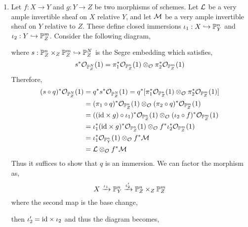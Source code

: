 \documentclass[12pt]{article}
\begin{document}
\begin{enumerate}
\item Let $f : X \to Y$ and $g : Y \to Z$ be two morphisms of schemes. Let $\L$ be a very ample invertible sheaf on $X$ relative $Y$, and let $\M$ be a very ample invertible sheaf on $Y$ relative to $Z$. These define closed immersions $\iota_1 : X \embed \P^n_Y$ and $\iota_2 : Y \embed \P^m_Z$.
Consider the following diagram,
\begin{center}
\end{center}
where $s : \P^n_Z \times_Z \P^m_Z \embed \P^{N}_Z$ is the Segre embedding which satisfies,
\[ s^* \struct{\P^{N}_Z}(1) = \pi_1^* \struct{\P^n_Z}(1) \otimes_{\struct{}} \pi_2^* \struct{\P^m_Z}(1) \]
Therefore,
\begin{align*}
(s \circ q)^* \struct{\P^N_Z}(1) & = q^* s^* \struct{\P^N_Z}(1) = q^* [\pi_1^* \struct{\P^n_Z}(1) \otimes_{\struct{}} \pi_2^* \struct{\P^m_Z}(1)] 
\\
& = (\pi_1 \circ q)^* \struct{\P^n_Z}(1) \otimes_{\struct{}} (\pi_2 \circ q)^* \struct{\P^m_Z}(1)
\\
& = ((\id \times g) \circ \iota_1)^* \struct{\P^n_Z}(1) \otimes_{\struct{}} (\iota_2 \circ f)^* \struct{\P^m_Z}(1)
\\
& = \iota_1^* (\id \times g)^* \struct{\P^n_Z}(1) \otimes_{\struct{}} f^* \iota_2^* \struct{\P^m_Z}(1)
\\
& = \iota_1^* \struct{\P^n_Y}(1) \otimes_{\struct{}} f^* \M 
\\
& = \L \otimes_{\struct{}} f^* \M
\end{align*}
Thus it suffices to show that $q$ is an immersion. We can factor the morphism as,
\[ X \xrightarrow{\iota_1} \P^n_Y \xrightarrow{\iota_2'} \P_Z^n \times_Z \P^m_Z \] where the second map is the base change,
\begin{center}
\end{center}
then $\iota_2' = \id \times \iota_2$ and thus the diagram becomes,

\end{enumerate}
\end{document}
